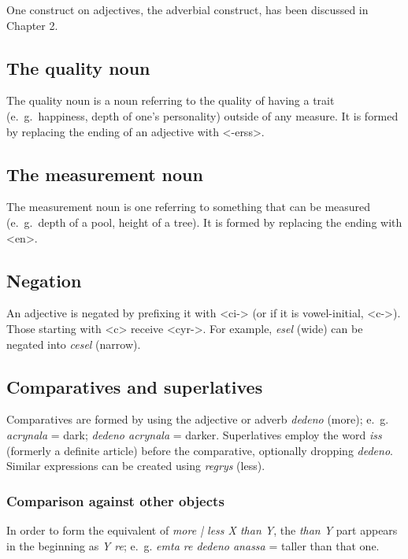 \documentclass{book}
\begin{document}
One construct on adjectives, the adverbial construct, has been discussed in Chapter 2.

\subsection{The quality noun}

The quality noun is a noun referring to the quality of having a trait (e.~g.~happiness, depth of one's personality) outside of any measure. It is formed by replacing the ending of an adjective with <-erss>.

\subsection{The measurement noun}

The measurement noun is one referring to something that can be measured (e.~g.~depth of a pool, height of a tree). It is formed by replacing the ending with <en>.

\subsection{Negation}

An adjective is negated by prefixing it with <ci-> (or if it is vowel-initial, <c->). Those starting with <c> receive <cyr->. For example, \emph{esel} (wide) can be negated into \emph{cesel} (narrow).

\subsection{Comparatives and superlatives}

Comparatives are formed by using the adjective or adverb \emph{dedeno} (more); e.~g. \emph{acrynala} = dark; \emph{dedeno acrynala} = darker. Superlatives employ the word \emph{iss} (formerly a definite article) before the comparative, optionally dropping \emph{dedeno}. Similar expressions can be created using \emph{regrys} (less).

\subsubsection{Comparison against other objects}

In order to form the equivalent of \emph{more | less X than Y}, the \emph{than Y} part appears in the beginning as \emph{Y re}; e.~g. \emph{emta re dedeno anassa} = taller than that one.
\end{document}
